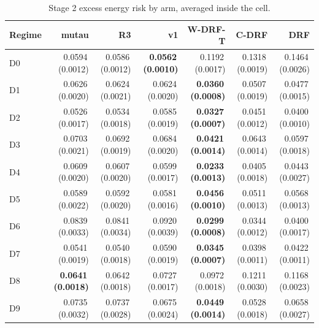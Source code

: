 \begin{table}[htbp]
\centering
\caption{Stage 2 excess energy risk by arm, averaged inside the cell.}
\label{tab:p55s2-energy}
\scriptsize
\setlength{\tabcolsep}{3.2pt}
\begin{tabular}{@{}lrrrrrr@{}}
\toprule
Regime & mutau & R3 & v1 & W-DRF-T & C-DRF & DRF \\
\midrule
D0 & 0.0594\,(0.0012) & 0.0586\,(0.0012) & \textbf{0.0562\,(0.0010)} & 0.1192\,(0.0017) & 0.1318\,(0.0019) & 0.1464\,(0.0026) \\
D1 & 0.0626\,(0.0020) & 0.0624\,(0.0021) & 0.0624\,(0.0020) & \textbf{0.0360\,(0.0008)} & 0.0507\,(0.0019) & 0.0477\,(0.0015) \\
D2 & 0.0526\,(0.0017) & 0.0534\,(0.0018) & 0.0585\,(0.0019) & \textbf{0.0327\,(0.0007)} & 0.0451\,(0.0012) & 0.0400\,(0.0010) \\
D3 & 0.0703\,(0.0021) & 0.0692\,(0.0019) & 0.0684\,(0.0020) & \textbf{0.0421\,(0.0014)} & 0.0643\,(0.0014) & 0.0597\,(0.0018) \\
D4 & 0.0609\,(0.0020) & 0.0607\,(0.0020) & 0.0599\,(0.0017) & \textbf{0.0233\,(0.0013)} & 0.0405\,(0.0018) & 0.0443\,(0.0027) \\
D5 & 0.0589\,(0.0022) & 0.0592\,(0.0020) & 0.0581\,(0.0016) & \textbf{0.0456\,(0.0010)} & 0.0511\,(0.0013) & 0.0568\,(0.0013) \\
D6 & 0.0839\,(0.0033) & 0.0841\,(0.0034) & 0.0920\,(0.0039) & \textbf{0.0299\,(0.0008)} & 0.0344\,(0.0012) & 0.0400\,(0.0017) \\
D7 & 0.0541\,(0.0019) & 0.0540\,(0.0018) & 0.0590\,(0.0019) & \textbf{0.0345\,(0.0007)} & 0.0398\,(0.0011) & 0.0422\,(0.0011) \\
D8 & \textbf{0.0641\,(0.0018)} & 0.0642\,(0.0018) & 0.0727\,(0.0017) & 0.0972\,(0.0018) & 0.1211\,(0.0030) & 0.1168\,(0.0023) \\
D9 & 0.0735\,(0.0032) & 0.0737\,(0.0028) & 0.0675\,(0.0024) & \textbf{0.0449\,(0.0014)} & 0.0528\,(0.0018) & 0.0658\,(0.0027) \\
\bottomrule
\end{tabular}
\end{table}

